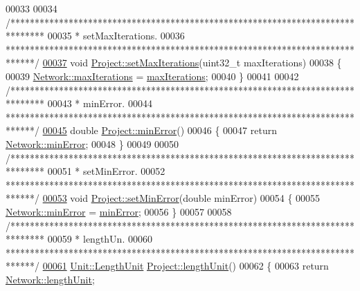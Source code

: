 \begin{DoxyCode}
00033 
00034 \textcolor{comment}{/*******************************************************************************}
00035 \textcolor{comment}{ * setMaxIterations.}
00036 \textcolor{comment}{ ******************************************************************************/}
\hypertarget{project_8cpp_source_l00037}{}\hyperlink{class_project_af2046a5d542d3e3dd51cb9cb04604e8f}{00037} \textcolor{keywordtype}{void} \hyperlink{class_project_af2046a5d542d3e3dd51cb9cb04604e8f}{Project::setMaxIterations}(uint32\_t maxIterations)
00038 \{
00039   \hyperlink{group___models_ga318dee060bc577eacd67d332efbbe1b2}{Network::maxIterations} = \hyperlink{class_project_ab9d6426396a75f2fcaeadcddcd0fac64}{maxIterations};
00040 \}
00041 
00042 \textcolor{comment}{/*******************************************************************************}
00043 \textcolor{comment}{ * minError.}
00044 \textcolor{comment}{ ******************************************************************************/}
\hypertarget{project_8cpp_source_l00045}{}\hyperlink{class_project_a457ed8d3b0ea5816f928977509f69a34}{00045} \textcolor{keywordtype}{double} \hyperlink{class_project_a457ed8d3b0ea5816f928977509f69a34}{Project::minError}()
00046 \{
00047   \textcolor{keywordflow}{return} \hyperlink{group___models_gabcdc973129d3dda7572b7a1c388da1b5}{Network::minError};
00048 \}
00049 
00050 \textcolor{comment}{/*******************************************************************************}
00051 \textcolor{comment}{ * setMinError.}
00052 \textcolor{comment}{ ******************************************************************************/}
\hypertarget{project_8cpp_source_l00053}{}\hyperlink{class_project_a2cb776c39adb42a1113bf7887d0d4636}{00053} \textcolor{keywordtype}{void} \hyperlink{class_project_a2cb776c39adb42a1113bf7887d0d4636}{Project::setMinError}(\textcolor{keywordtype}{double} minError)
00054 \{
00055   \hyperlink{group___models_gabcdc973129d3dda7572b7a1c388da1b5}{Network::minError} = \hyperlink{class_project_a457ed8d3b0ea5816f928977509f69a34}{minError};
00056 \}
00057 
00058 \textcolor{comment}{/*******************************************************************************}
00059 \textcolor{comment}{ * lengthUn.}
00060 \textcolor{comment}{ ******************************************************************************/}
\hypertarget{project_8cpp_source_l00061}{}\hyperlink{class_project_a40cd2f59a4a708897e5997942c046f4d}{00061} \hyperlink{class_unit_a8c8921f7b225ad6063b1cb573425b9a0}{Unit::LengthUnit} \hyperlink{class_project_a40cd2f59a4a708897e5997942c046f4d}{Project::lengthUnit}()
00062 \{
00063   \textcolor{keywordflow}{return} \hyperlink{group___models_gae46c0e2bf39b343875e3c69066fe2652}{Network::lengthUnit};

\end{DoxyCode}
